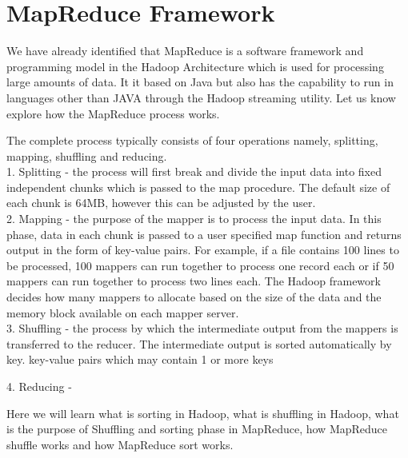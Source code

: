 \documentclass[11pt]{book}
\begin{document}
\chapter{MapReduce Framework}

We have already identified that MapReduce is a software framework and programming model in the Hadoop Architecture which is used for processing large amounts of data. It it based on Java but also has the capability to run in languages other than JAVA through the Hadoop streaming utility. Let us know explore how the MapReduce process works.

The complete process typically consists of four operations namely, splitting, mapping, shuffling and reducing.\\

1. Splitting - the process will first break and divide the input data into fixed independent chunks which is passed to the map procedure. The default size of each chunk is 64MB, however this can be adjusted by the user. \\

2. Mapping - the purpose of the mapper is to process the input data. In this phase, data in each chunk is passed to a user specified map function and returns output in the form of key-value pairs. For example, if a file contains 100 lines to be processed, 100 mappers can run together to process one record each or if 50 mappers can run together to process two lines each. The Hadoop framework decides how many mappers to allocate based on the size of the data and the memory block available on each mapper server.\\

3. Shuffling - the process by which the intermediate output from the mappers is transferred to the reducer. The intermediate output is sorted automatically by key. key-value pairs which may contain 1 or more keys 

4. Reducing - 




Here we will learn what is sorting in Hadoop, what is shuffling in Hadoop, what is the purpose of Shuffling and sorting phase in MapReduce, how MapReduce shuffle works and how MapReduce sort works. 
\end{document}
